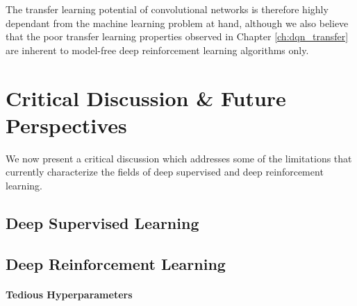 \begin{enumerate}
The transfer learning potential of convolutional networks is therefore highly dependant from the machine learning problem at hand, although we also believe that the poor transfer learning properties observed in Chapter \ref{ch:dqn_transfer} are inherent to model-free deep reinforcement learning algorithms only.


\end{enumerate}


\section{Critical Discussion \& Future Perspectives}
\label{sec:critical_discussion}

We now present a critical discussion which addresses some of the limitations that currently characterize the fields of deep supervised and deep reinforcement learning. 


\subsection{Deep Supervised Learning}



\subsection{Deep Reinforcement Learning}
\paragraph{Tedious Hyperparameters}

